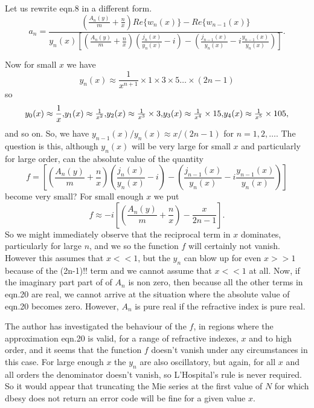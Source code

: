 Let us rewrite eqn.8 in a different form.
\begin{equation}
a_n=\frac{ \left ( 
\frac{A_n(y)}{m}+\frac{n}{x}
 \right )
Re \lbrace w_n(x) \rbrace -Re \lbrace w_{n-1}(x) \rbrace
}
{ y_n(x) \left \lbrack \left ( 
\frac{A_n(y)}{m}+\frac{n}{x} 
\right )
 \left ( \frac{j_n(x)}{y_n(x)}-i \right )-
 \left (
\frac{j_{n-1}(x)}{y_n(x)}-i 
  \frac{y_{n-1}(x)}{y_n(x)} \right ) \right \rbrack
}.
\end{equation}

Now for small $x$ we have
\begin{equation}
y_n(x) \approx \frac{1}{x^{n+1}} \times 1 \times 3 \times 5 \ldots \times (2n-1)\end{equation}
so
\begin{equation}
y_0(x) \approx \frac{1}{x},
$$    $$
y_1(x) \approx \frac{1}{x^2},
$$   $$
y_2(x) \approx \frac{1}{x^3} \times 3,
$$    $$
y_3(x) \approx \frac{1}{x^4} \times 15,
$$   $$
y_4(x) \approx \frac{1}{x^5} \times 105, 
\end{equation}
and so on.
So, we have $y_{n-1}(x)/ y_n (x) \approx x/(2n-1)$ for $n=1,2,\ldots$.
The question is this, although $y_n(x)$ will be very large for small
$x$ and particularly  for large order, can the absolute value of
the quantity
\begin{equation}
  f=\left \lbrack \left ( 
\frac{A_n(y)}{m}+\frac{n}{x} 
\right )
 \left ( \frac{j_n(x)}{y_n(x)}-i \right )-
 \left (
\frac{j_{n-1}(x)}{y_n(x)}-i 
  \frac{y_{n-1}(x)}{y_n(x)} \right ) \right \rbrack
\end{equation}
become very small?
For small enough $x$ we put
\begin{equation}
  f \approx  -i
 \left  \lbrack 
 \left ( 
 \frac{A_n(y)}{m}+\frac{n}{x} 
 \right )
- \frac{x}{2n-1} 
   \right \rbrack.
\end{equation}
So we might immediately observe that the reciprocal term in $x$ 
dominates, particularly for large $n$, and we so the function 
$f$ will certainly not vanish. However this assumes that $x<<1$, but
the $y_n$ can blow up for even $x>>1$ because of the (2n-1)!! term
and we cannot assume that $x<< 1$ at all. Now, if the imaginary part
part of of $A_n$ is non zero, then because all the other terms in eqn.20
are real, we cannot arrive at the situation where the absolute value
of eqn.20 becomes zero. However,  $A_n$  is pure real if the refractive
 index is pure real.

 The author has investigated the behaviour of the
$f$, in regions where the approximation eqn.20 is valid, for a range of
refractive indexes, $x$ and to high order, and it seems that the function $f$ 
doesn't vanish under any circumstances in this case. 
For large enough $x$ the $y_n$ are also oscillatory, but again, for
all $x$ and all orders the denominator doesn't vanish, so L'Hospital's rule
is never required.
So it would appear that truncating the Mie series 
at the first value of $N$ for which dbesy does not return an error code will 
be fine for a given value $x$.

